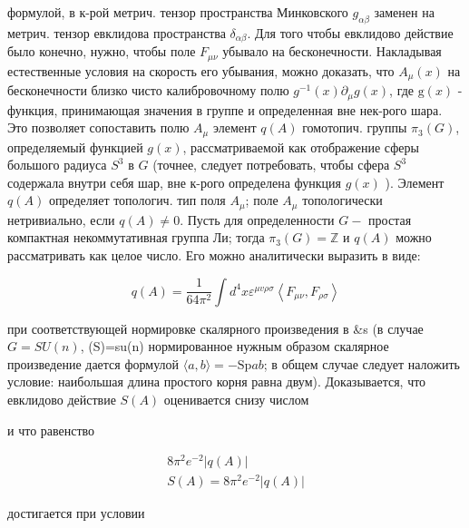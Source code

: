 \documentclass[10pt]{article}
\begin{document}
формулой, в к-рой метрич. тензор пространства Минковского $g_{\alpha \beta}$ заменен на метрич. тензор евклидова пространства $\delta_{\alpha \beta}$. Для того чтобы евклидово действие было конечно, нужно, чтобы поле $F_{\mu \nu}$ убывало на бесконечности. Накладывая естественные условия на скорость его убывания, можно доказать, что $A_{\mu}(x)$ на бесконечности близко чисто калибровочному полю $g^{-1}(x) \partial_{\mu} g(x)$, где $\mathrm{g}(x)$ - функция, принимающая значения в группе и определенная вне нек-рого шара. Это позволяет сопоставить полю $A_{\mu}$ элемент $q(A)$ гомотопич. группы $\pi_{3}(G)$, определяемый функцией $g(x)$, рассматриваемой как отображение сферы большого радиуса $S^{3}$ в $G$ (точнее, следует потребовать, чтобы сфера $S^{3}$ содержала внутри себя шар, вне к-рого определена функция $g(x)$ ). Элемент $q(A)$ определяет топологич. тип поля $A_{\mu}$; поле $A_{\mu}$ топологически нетривиально, если $q(A) \neq 0$. Пусть для определенности $G-$ простая компактная некоммутативная группа Ли; тогда $\pi_{3}(G)=\mathbb{Z}$ и $q(A)$ можно рассматривать как целое число. Его можно аналитически выразить в виде:



\[

q(A)=\frac{1}{64 \pi^{2}} \int d^{4} x \varepsilon^{\mu v \rho \sigma}\left\langle F_{\mu \nu}, F_{\rho \sigma}\right\rangle

\]



при соответствующей нормировке скалярного произведения в \&s (в случае $G=S U(n)$, (S)=su(n) нормированное нужным образом скалярное произведение дается формулой $\langle a, b\rangle=-\mathrm{Sp} a b$; в общем случае следует наложить условие: наибольшая длина простого корня равна двум). Доказывается, что евклидово действие $S(A)$ оценивается снизу числом



и что равенство



\[

\begin{gathered}

8 \pi^{2} e^{-2}|q(A)| \\

S(A)=8 \pi^{2} e^{-2}|q(A)|

\end{gathered}

\]



достигается при условии
\end{document}
